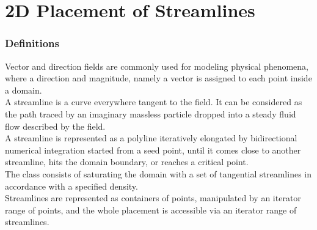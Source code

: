 
\chapter{2D Placement of Streamlines}
\label{ref_chapter_2D_Streamlines}


\subsection*{Definitions}

Vector and direction fields are commonly used for modeling physical
phenomena, where a direction and magnitude, namely a vector is assigned to
each point inside a domain.\\

A streamline is a curve everywhere tangent to the field. It can be
considered as the path traced by an imaginary massless particle
dropped into a steady fluid flow described by the field.\\

A streamline is represented as a polyline iteratively elongated by
bidirectional numerical integration started from a seed point, until
it comes close to another streamline, hits the domain boundary, or
reaches a critical point.\\

The  class consists of saturating the domain with
a set of tangential streamlines in accordance with a specified
density.\\

Streamlines are represented as containers of points, manipulated by an
iterator range of points, and the whole placement is accessible via an
iterator range of streamlines.\\

